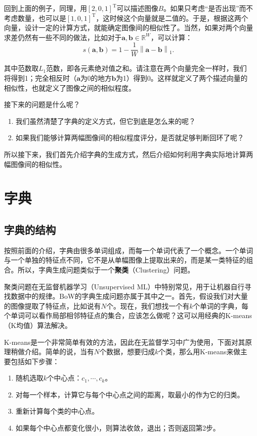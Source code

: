 回到上面的例子，同理，用$[2,0,1]^\mathrm{T}$可以描述图像$B$。如果只考虑“是否出现”而不考虑数量，也可以是$[1,0,1]^\mathrm{T}$，这时候这个向量就是二值的。于是，根据这两个向量，设计一定的计算方式，就能确定图像间的相似性了。当然，如果对两个向量求差仍然有一些不同的做法，比如对于$\bm{a}, \bm{b} \in \mathbb{R}^W$，可以计算：
\begin{equation}
s\left( {\bm{a},\bm{b}} \right) = 1 - \frac{1}{W}\left\| {\bm{a} - \bm{b}} \right\|_1.
\end{equation}

其中范数取$L_1$范数，即各元素绝对值之和。请注意在两个向量完全一样时，我们将得到1；完全相反时（$\bm{a}$为0的地方$\bm{b}$为1）得到0。这样就定义了两个描述向量的相似性，也就定义了图像之间的相似程度。

接下来的问题是什么呢？

\begin{enumerate}
	\item 我们虽然清楚了字典的定义方式，但它到底是怎么来的呢？
	\item 如果我们能够计算两幅图像间的相似程度评分，是否就足够判断回环了呢？
\end{enumerate}

所以接下来，我们首先介绍字典的生成方式，然后介绍如何利用字典实际地计算两幅图像间的相似性。

\section{字典}
\subsection{字典的结构}
按照前面的介绍，字典由很多单词组成，而每一个单词代表了一个概念。一个单词与一个单独的特征点不同，它不是从单幅图像上提取出来的，而是某一类特征的组合。所以，字典生成问题类似于一个\textbf{聚类}（Clustering）问题。

聚类问题在无监督机器学习（Unsupervised ML）中特别常见，用于让机器自行寻找数据中的规律。BoW的字典生成问题亦属于其中之一。首先，假设我们对大量的图像提取了特征点，比如说有$N$个。现在，我们想找一个有$k$个单词的字典，每个单词可以看作局部相邻特征点的集合，应该怎么做呢？这可以用经典的K-means（K均值）算法\textsuperscript{\cite{Lloyd1982}}解决。

K-means是一个非常简单有效的方法，因此在无监督学习中广为使用，下面对其原理稍做介绍。简单的说，当有$N$个数据，想要归成$k$个类，那么用K-means来做主要包括如下步骤：
\begin{mdframed}
\begin{enumerate}
	\item 随机选取$k$个中心点：$c_1, \cdots, c_k$。
	\item 对每一个样本，计算它与每个中心点之间的距离，取最小的作为它的归类。
	\item 重新计算每个类的中心点。
	\item 如果每个中心点都变化很小，则算法收敛，退出；否则返回第2步。
\end{enumerate}
\end{mdframed}

